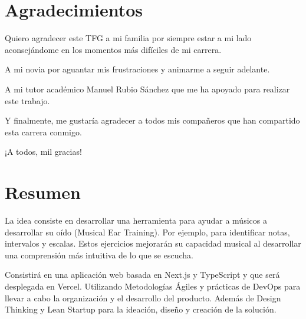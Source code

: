 \documentclass[12pt,twoside,titlepage]{report}
\newcommand\blankpage{%
    \newpage
    \null
    \thispagestyle{empty}%
    \newpage}
\begin{document}
\hypersetup{pageanchor=true}
\normalsize
\afterpage{\blankpage}
 
\setlength{\parskip}{0.75em}
\renewcommand{\baselinestretch}{1.25}

\setcounter{page}{2}


 

\chapter*{Agradecimientos}

Quiero agradecer este TFG a mi familia por siempre estar a mi lado aconsejándome en los momentos más difíciles de mi carrera. 

A mi novia por aguantar mis frustraciones y animarme a seguir adelante. 

A mi tutor académico Manuel Rubio Sánchez que me ha apoyado para realizar este trabajo. 

Y finalmente, me gustaría agradecer a todos mis compañeros que han compartido esta carrera conmigo.

¡A todos, mil gracias!
\afterpage{\blankpage}


 

\chapter*{Resumen}
La idea consiste en desarrollar una herramienta para ayudar a músicos a desarrollar su oído (Musical Ear Training). Por ejemplo, para identificar notas, intervalos y escalas. Estos ejercicios mejorarán su capacidad musical al desarrollar una comprensión más intuitiva de lo que se escucha.

Consistirá en una aplicación web basada en Next.js y TypeScript y que será desplegada en Vercel. Utilizando Metodologías Ágiles y prácticas de DevOps para llevar a cabo la organización y el desarrollo del producto. Además de Design Thinking y Lean Startup para la ideación, diseño y creación de la solución.
\end{document}
